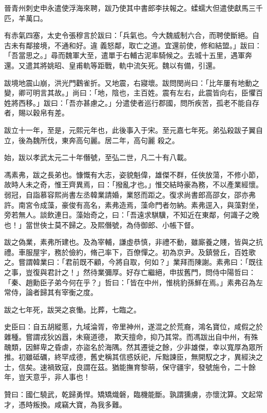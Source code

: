 \begin{pinyinscope}
 晉青州刺史申永遣使浮海來聘，跋乃使其中書郎李扶報之。蝚蠕大但遣使獻馬三千匹，羊萬口。



 有赤氣四塞，太史令張穆言於跋曰：「兵氣也。今大魏威制六合，而聘使斷絕。自古未有鄰接境，不通和好。違
 義怒鄰，取亡之道。宜還前使，修和結盟。」跋曰：「吾當思之。」尋而魏軍大至，遣單于右輔古泥率騎候之。去城十五里，遇軍奔還。又遣其將姚昭、皇甫軌等距戰，軌中流矢死。魏以有備，引還。



 跋境地震山崩，洪光門鸛雀折。又地震，右寢壞。跋問閔尚曰：「比年屢有地動之變，卿可明言其故。」尚曰：「地，陰也，主百姓。震有左右，此震皆向右，臣懼百姓將西移。」跋曰：「吾亦甚慮之。」分遣使者巡行郡國，問所疾苦，孤老不能自存者，賜以穀帛有差。



 跋立十一年，至是，元熙元年也，此後事入于宋。至元嘉七年死。弟弘殺跋子翼自立，後為魏所伐，東奔高句麗。居二年，高句麗
 殺之。



 始，跋以孝武太元二十年僭號，至弘二世，凡二十有八載。



 馮素弗，跋之長弟也。慷慨有大志，姿貌魁偉，雄傑不群，任俠放蕩，不修小節，故時人未之奇，惟王齊異焉，曰：「撥亂才也。」惟交結時豪為務，不以產業經懷。弱冠，自詣慕容熙尚書左丞韓業請婚，業怒而距之。復求尚書郎高邵女，邵亦弗許。南宮令成藻，豪俊有高名，素弗造焉，藻命門者勿納。素弗逕入，與藻對坐，旁若無人。談飲連日。藻始奇之，曰：「吾遠求騏驥，不知近在東鄰，何識子之晚也！」當世俠士莫不歸之。及熙僭號，為侍御郎、小帳下督。



 跋之偽業，素弗所建也。及為宰輔，謙虛恭慎，非禮不動，雖廝養之賤，皆與之抗禮。車服屋宇，務於儉約，脩己率下，百僚憚之。初為京尹。及鎮營丘，百姓歌之。嘗謂韓業曰：「君前既不顧，今將自取，何如？」業拜而陳謝。素弗曰：「既往之事，豈復與君計之！」然待業彌厚。好存亡繼絕，申拔舊門，問侍中陽哲曰：「秦、趙勳臣子弟今何在乎？」哲曰：「皆在中州，惟桃豹孫鮮在焉。」素弗召為左常侍，論者歸其有宰衡之度。



 跋之七年死，跋哭之哀慟。比葬，七臨之。



 史臣曰：自五胡縱慝，九域淪胥，帝里神州，遂混之於荒裔，鴻名寶位，咸假之於雜種。嘗謂戎狄凶囂，未窺道德，
 欺天擅命，抑乃其常。而馮跋出自中州，有殊醜類，因鮮卑之昏虐，亦盜名於海隅。然其遷徙之餘，少非雄傑，幸以寬厚為眾所推。初雖砥礪，終罕成德，舊史稱其信惑妖祀，斥黜諫臣，無開馭之才，異經決之士，信矣。速禍致寇，良謂在茲。猶能撫育黎萌，保守疆宇，發號施令，二十餘年，豈天意乎，非人事也！



 贊曰：國仁驍武，乾歸勇悍。矯矯熾磐，臨機能斷。孰謂獯虜，亦懷沈算。文起常才，憑時叛換。咸竊大寶，為我多難。



\end{pinyinscope}